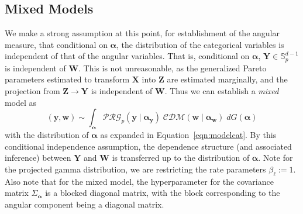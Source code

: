 \subsection{Mixed Models}
We make a strong assumption at this point, for establishment of the angular
    measure, that conditional on $\bm{\alpha}$, the distribution of the 
    categorical variables is independent of that of the angular variables.  
    That is, conditional on $\bm{\alpha}$, $\bm{Y} \in {\mathbb S}_{p}^{d-1}$ 
    is independent of $\bm{W}$.  This is not unreasonable, as the generalized 
    Pareto parameters estimated to transform $\bm{X}$ into $\bm{Z}$ are 
    estimated marginally, and the projection from $\bm{Z}\to\bm{Y}$ is 
    independent of $\bm{W}$.  Thus we can establish a \emph{mixed} model as
    \begin{equation}
        \label{model:mixed}
        (\bm{y},\bm{w})\sim \int_{\bm{\alpha}}\mathcal{PRG}_{p}
            (\bm{y}\mid\bm{\alpha}_{\bm{y}})
        \;\mathcal{CDM}(\bm{w}\mid\bm{\alpha}_{\bm{w}})\;dG(\bm{\alpha})
    \end{equation}
  with the distribution of $\bm{\alpha}$ as expanded in 
    Equation~\ref{eqn:modelcat}. By this conditional independence assumption, 
    the dependence structure (and associated inference) between  $\bm{Y}$ and 
    $\bm{W}$ is transferred up to the distribution of $\bm{\alpha}$.  Note for 
    the projected gamma distribution, we are restricting the rate parameters 
    $\beta_{\ell} := 1$.  Also note that for the mixed model, the hyperparameter 
    for the covariance matrix $\Sigma_{\bm{\alpha}}$ is a blocked diagonal 
    matrix, with the block corresponding to the angular component being a 
    diagonal matrix.

